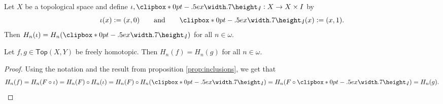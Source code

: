 \begin{proposition}
	Let $X$ be a topological space and define $\iota,\jota : X \to X \times I$ by 
	\begin{equation*}
		\iota(x) := (x,0) \qquad \text{and} \qquad \jota(x) := (x,1).
	\end{equation*}
	Then $H_n(\iota) = H_n(\jota)$ for all $n \in \omega$.
\end{proposition}

\begin{theorem}
	Let $f,g \in \mathsf{Top}(X,Y)$ be freely homotopic. Then $H_n(f) = H_n(g)$ for all $n \in \omega$.
\end{theorem}

\begin{proof}
	Using the notation and the result from proposition \ref{prop:inclusions}, we get that
	\begin{align*}
		H_n(f) = H_n(F \circ \iota) = H_n(F) \circ H_n(\iota) = H_n(F) \circ H_n(\jota) = H_n(F \circ \jota) = H_n(g).
	\end{align*}
\end{proof}

